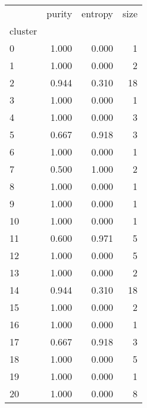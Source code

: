 \begin{tabular}{lrrr}
\toprule
{} &  purity &  entropy &  size \\
cluster &         &          &       \\
\midrule
0       &   1.000 &   0.000 &     1 \\
1       &   1.000 &   0.000 &     2 \\
2       &   0.944 &    0.310 &    18 \\
3       &   1.000 &   0.000 &     1 \\
4       &   1.000 &   0.000 &     3 \\
5       &   0.667 &    0.918 &     3 \\
6       &   1.000 &   0.000 &     1 \\
7       &   0.500 &    1.000 &     2 \\
8       &   1.000 &   0.000 &     1 \\
9       &   1.000 &   0.000 &     1 \\
10      &   1.000 &   0.000 &     1 \\
11      &   0.600 &    0.971 &     5 \\
12      &   1.000 &   0.000 &     5 \\
13      &   1.000 &   0.000 &     2 \\
14      &   0.944 &    0.310 &    18 \\
15      &   1.000 &   0.000 &     2 \\
16      &   1.000 &   0.000 &     1 \\
17      &   0.667 &    0.918 &     3 \\
18      &   1.000 &   0.000 &     5 \\
19      &   1.000 &   0.000 &     1 \\
20      &   1.000 &   0.000 &     8 \\
\bottomrule
\end{tabular}
